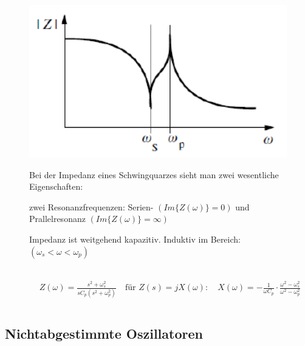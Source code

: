 \begin{figure}[h!]
\begin{minipage}{0.3\textwidth}
	\includegraphics[width=1.0\textwidth]{images/Impedanz(Frequenz)_Schwingquarz}
	\end{minipage}
	\begin{minipage}{0.6\textwidth}
      \vspace{0.5cm}
      Bei der Impedanz eines Schwingquarzes sieht man zwei wesentliche Eigenschaften:
      \begin{compactitem}
        \item zwei Resonanzfrequenzen: Serien- $(Im\{Z(\omega)\}=0)$ und Prallelresonanz $(Im\{Z(\omega)\}=\infty)$
        \item Impedanz ist weitgehend kapazitiv. Induktiv im Bereich:\\ $(\omega_s < \omega < \omega_p)$\\\\ 
      \end{compactitem}
      \begin{equation*} 
        \begin{split} 
         & Z (\omega)=\frac{s^2+\omega _s ^2}{sC_p(s^2+\omega_p ^2)} \quad \text{für } Z(s) = jX(\omega): \quad X(\omega)=-\frac{1}{\omega C_p}\cdot \frac{\omega^2-\omega_s ^2}{\omega^2-\omega_p ^2}\\\\
        \end{split} 
      \end{equation*}
	\end{minipage}
\end{figure}

\FloatBarrier
\subsection{Nichtabgestimmte Oszillatoren}
